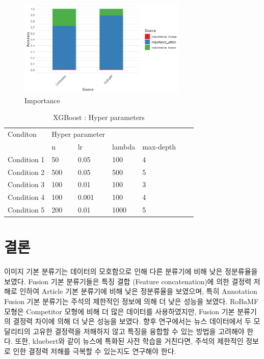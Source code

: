 \documentclass{article}
\begin{document}
\begin{figure}[ht]
    \centering
    \includegraphics[width=8cm]{ENG/importance.png}
    \caption{Importance}
    \label{fig.last}
\end{figure}


\begin{table}[htbp]
\centering
\caption{XGBoost : Hyper parameters}
\label{your-label}
\begin{tabular}{@{}lllllll@{}}
\toprule
Conditon     & \multicolumn{2}{c}{Hyper parameter} \\
             & n      & lr      & lambda      & max-depth     \\
Condition 1   & 50         & 0.05         & 100         & 4        \\
Condition 2   & 500         & 0.05         & 500         & 5       \\
Condition 3   & 100         & 0.01         & 100         & 3       \\
Condition 4   & 100         & 0.001        & 100         & 4       \\
Condition 5   & 200         & 0.01        & 1000         & 5       \\
\bottomrule
\end{tabular}
\end{table}

\section{결론}
이미지 기본 분류기는 데이터의 모호함으로 인해 다른 분류기에 비해 낮은 정분류율을 보였다. Fusion 기본 분류기들은 특징 결합 (Feature concatenation)에 의한 결정력 저해로 인하여 Article 기본 분류기에 비해 낮은 정분류율을 보였으며, 특히 Annotation Fusion 기본 분류기는 주석의 제한적인 정보에 의해 더 낮은 성능을 보였다.
RoBaMF 모형은 Competitor 모형에 비해 더 많은 데이터를 사용하였지만, Fusion 기본 분류기의 결정력 차이에 의해 더 낮은 성능을 보였다.
향후 연구에서는 뉴스 데이터에서 두 모달리티의 고유한 결정력을 저해하지 않고 특징을 융합할 수 있는 방법을 고려해야 한다. 또한, kluebert와 같이 뉴스에 특화된 사전 학습을 거친다면, 주석의 제한적인 정보로 인한 결정력 저해를 극복할 수 있는지도 연구해야 한다.
\end{document}
